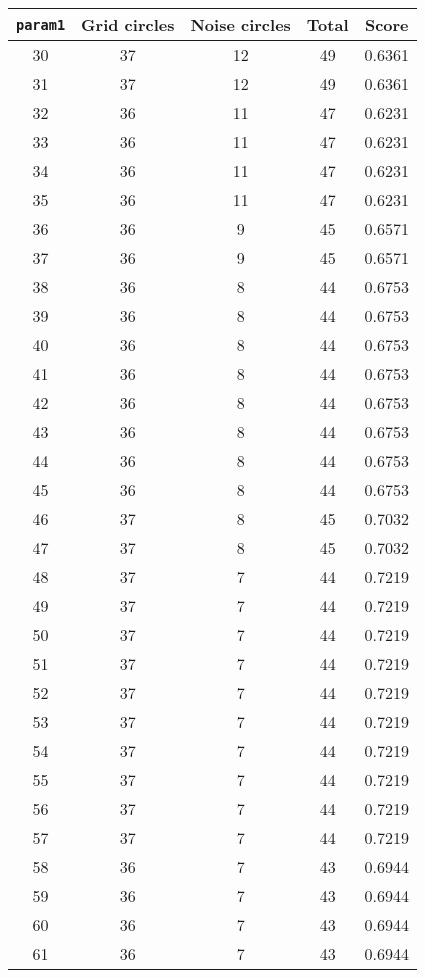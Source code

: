 \documentclass[letterpaper, 12pt]{article}
\begin{document}
\begin{longtable}{|c|c|c|c|c|}
\hline
\textbf{\texttt{param1}} & \textbf{Grid circles} & \textbf{Noise circles} & \textbf{Total} & \textbf{Score} \\
\hline
30 & 37 & 12 & 49 & 0.6361 \\
\hline
31 & 37 & 12 & 49 & 0.6361 \\
\hline
32 & 36 & 11 & 47 & 0.6231 \\
\hline
33 & 36 & 11 & 47 & 0.6231 \\
\hline
34 & 36 & 11 & 47 & 0.6231 \\
\hline
35 & 36 & 11 & 47 & 0.6231 \\
\hline
36 & 36 & 9 & 45 & 0.6571 \\
\hline
37 & 36 & 9 & 45 & 0.6571 \\
\hline
38 & 36 & 8 & 44 & 0.6753 \\
\hline
39 & 36 & 8 & 44 & 0.6753 \\
\hline
40 & 36 & 8 & 44 & 0.6753 \\
\hline
41 & 36 & 8 & 44 & 0.6753 \\
\hline
42 & 36 & 8 & 44 & 0.6753 \\
\hline
43 & 36 & 8 & 44 & 0.6753 \\
\hline
44 & 36 & 8 & 44 & 0.6753 \\
\hline
45 & 36 & 8 & 44 & 0.6753 \\
\hline
46 & 37 & 8 & 45 & 0.7032 \\
\hline
47 & 37 & 8 & 45 & 0.7032 \\
\hline
48 & 37 & 7 & 44 & 0.7219 \\
\hline
49 & 37 & 7 & 44 & 0.7219 \\
\hline
50 & 37 & 7 & 44 & 0.7219 \\
\hline
51 & 37 & 7 & 44 & 0.7219 \\
\hline
52 & 37 & 7 & 44 & 0.7219 \\
\hline
53 & 37 & 7 & 44 & 0.7219 \\
\hline
54 & 37 & 7 & 44 & 0.7219 \\
\hline
55 & 37 & 7 & 44 & 0.7219 \\
\hline
56 & 37 & 7 & 44 & 0.7219 \\
\hline
57 & 37 & 7 & 44 & 0.7219 \\
\hline
58 & 36 & 7 & 43 & 0.6944 \\
\hline
59 & 36 & 7 & 43 & 0.6944 \\
\hline
60 & 36 & 7 & 43 & 0.6944 \\
\hline
61 & 36 & 7 & 43 & 0.6944 \\

\end{longtable}
\end{document}

